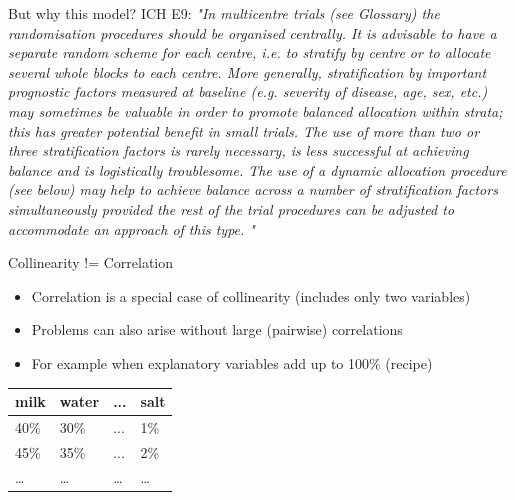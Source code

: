 \documentclass[english]{beamer}\usepackage[]{graphicx}\usepackage[]{xcolor}
\begin{document}
\begin{frame}[plain]{But why this model?}
ICH E9:
\textit{
\tiny{
"In multicentre trials (see Glossary) the randomisation procedures should be organised centrally. It is advisable to have a separate random scheme for each centre, i.e. to stratify by centre or to allocate several whole blocks to each centre. More generally, stratification by important prognostic factors measured at baseline (e.g. severity of disease, age, sex, etc.) may sometimes be valuable in order to promote balanced allocation within strata; this has greater potential benefit in small trials. The use of more than two or three stratification factors is rarely necessary, is less successful at achieving balance and is logistically troublesome. The use of a dynamic allocation procedure (see below) may help to achieve balance across a number of stratification factors simultaneously provided the rest of the trial procedures can be adjusted to accommodate an approach of this type.}\footnotesize{
"
}
}

\end{frame}
\begin{frame}{Collinearity != Correlation}

\begin{itemize}
\item Correlation is a special case of collinearity (includes only two variables)
\item Problems can also arise without large (pairwise) correlations
\item For example when explanatory variables add up to 100\% (recipe)
\end{itemize}


\begin{table}[]
\centering
\begin{tabular}{|l|l|l|l|}
\hline
milk & water & ... & salt \\ 
\hline
40\% & 30\%  & ... & 1\%  \\ 
45\% & 35\%  & ... & 2\%  \\
\dots& \dots  & \dots & \dots  \\ \hline
\end{tabular}%
\end{table}




\end{frame}
\end{document}
